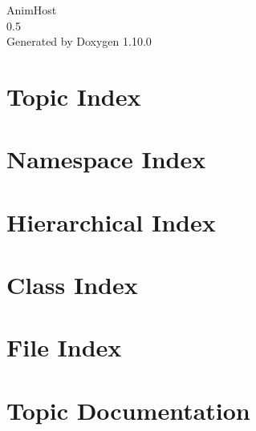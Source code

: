 \documentclass[twoside]{book}
\newcommand{\+}{\discretionary{\mbox{\scriptsize$\hookleftarrow$}}{}{}}
\newcommand{\clearemptydoublepage}{%
    \newpage{\pagestyle{empty}\cleardoublepage}%
  }
\begin{document}
  \raggedbottom
    \hypersetup{pageanchor=false,
                bookmarksnumbered=true,
                pdfencoding=unicode
               }
  \begin{titlepage}
  \vspace*{7cm}
  \begin{center}%
  {\Large Anim\+Host}\\
  [1ex]\large 0.\+5 \\
  \vspace*{1cm}
  {\large Generated by Doxygen 1.10.0}\\
  \end{center}
  \end{titlepage}
  \clearemptydoublepage
  \tableofcontents
  \clearemptydoublepage
  \hypersetup{pageanchor=true}






\chapter{Topic Index}

\chapter{Namespace Index}

\chapter{Hierarchical Index}

\chapter{Class Index}

\chapter{File Index}

\chapter{Topic Documentation}



\end{document}
